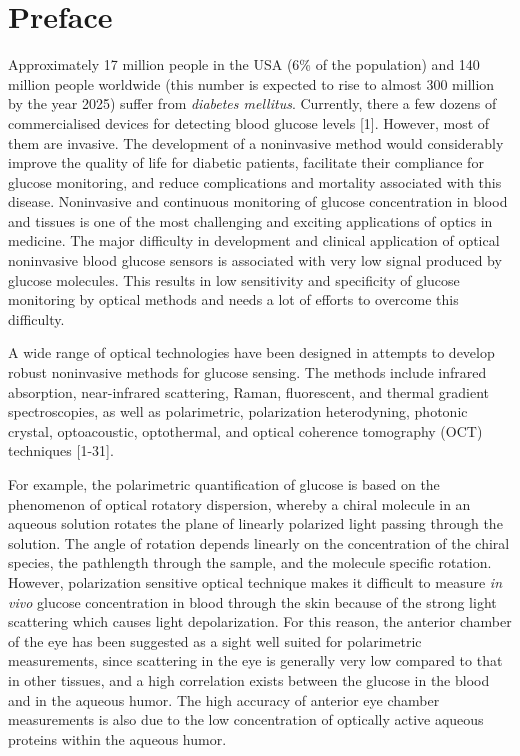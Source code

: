 \chapter*{Preface}

Approximately 17 million people in the USA (6{\%} of the
population) and 140 million people worldwide (this number is
expected to rise to almost 300 million by the year 2025) suffer
from \textit{diabetes mellitus}. Currently, there a few dozens of
commercialised devices for detecting blood glucose levels [1].
However, most of them are invasive. The development of a
noninvasive method would considerably improve the quality of life
for diabetic patients, facilitate their compliance for glucose
monitoring, and reduce complications and mortality associated with
this disease. Noninvasive and continuous monitoring of glucose
concentration in blood and tissues is one of the most challenging
and exciting applications of optics in medicine. The major
difficulty in development and clinical application of optical
noninvasive blood glucose sensors is associated with very low
signal produced by glucose molecules. This results in low
sensitivity and specificity of glucose monitoring by optical
methods and needs a lot of efforts to overcome this difficulty.

A wide range of optical technologies have been designed in
attempts to develop robust noninvasive methods for glucose
sensing. The methods include infrared absorption, near-infrared
scattering, Raman, fluorescent, and thermal gradient
spectroscopies, as well as polarimetric, polarization
heterodyning, photonic crystal, optoacoustic, optothermal, and
optical coherence tomography (OCT) techniques [1-31].

For example, the polarimetric quantification of glucose is based
on the phenomenon of optical rotatory dispersion, whereby a chiral
molecule in an aqueous solution rotates the plane of linearly
polarized light passing through the solution. The angle of
rotation depends linearly on the concentration of the chiral
species, the pathlength through the sample, and the molecule
specific rotation. However, polarization sensitive optical
technique makes it difficult to measure \textit{in vivo} glucose
concentration in blood through the skin because of the strong
light scattering which causes light depolarization. For this
reason, the anterior chamber of the eye has been suggested as a
sight well suited for polarimetric measurements, since scattering
in the eye is generally very low compared to that in other
tissues, and a high correlation exists between the glucose in the
blood and in the aqueous humor. The high accuracy of anterior eye
chamber measurements is also due to the low concentration of
optically active aqueous proteins within the aqueous humor.

